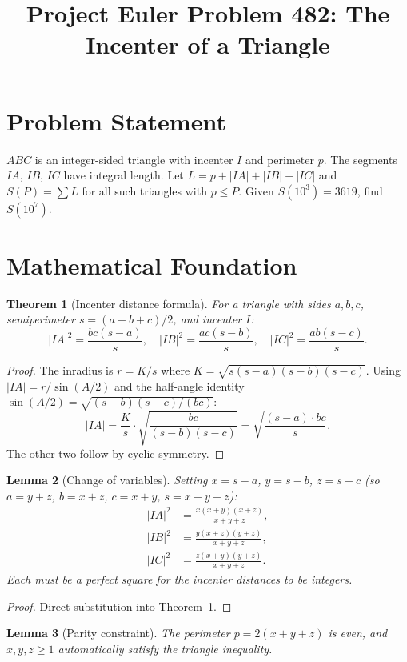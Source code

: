 \documentclass[12pt]{article}
\title{Project Euler Problem 482: The Incenter of a Triangle}
\author{}
\date{}
\newtheorem{theorem}{Theorem}
\newtheorem{lemma}[theorem]{Lemma}
\begin{document}
\maketitle

\section{Problem Statement}
$ABC$ is an integer-sided triangle with incenter $I$ and perimeter $p$. The segments $IA$, $IB$, $IC$ have integral length. Let $L = p + |IA| + |IB| + |IC|$ and $S(P) = \sum L$ for all such triangles with $p \le P$. Given $S(10^3) = 3619$, find $S(10^7)$.

\section{Mathematical Foundation}

\begin{theorem}[Incenter distance formula]
For a triangle with sides $a,b,c$, semiperimeter $s=(a+b+c)/2$, and incenter $I$:
\[
|IA|^2 = \frac{bc(s-a)}{s},\quad |IB|^2 = \frac{ac(s-b)}{s},\quad |IC|^2 = \frac{ab(s-c)}{s}.
\]
\end{theorem}

\begin{proof}
The inradius is $r = K/s$ where $K = \sqrt{s(s-a)(s-b)(s-c)}$. Using $|IA| = r/\sin(A/2)$ and the half-angle identity $\sin(A/2) = \sqrt{(s-b)(s-c)/(bc)}$:
\[
|IA| = \frac{K}{s}\cdot\sqrt{\frac{bc}{(s-b)(s-c)}} = \sqrt{\frac{(s-a)\cdot bc}{s}}.
\]
The other two follow by cyclic symmetry.
\end{proof}

\begin{lemma}[Change of variables]
Setting $x = s-a$, $y = s-b$, $z = s-c$ (so $a=y+z$, $b=x+z$, $c=x+y$, $s=x+y+z$):
\begin{align}
|IA|^2 &= \frac{x(x+y)(x+z)}{x+y+z},\\[4pt]
|IB|^2 &= \frac{y(x+z)(y+z)}{x+y+z},\\[4pt]
|IC|^2 &= \frac{z(x+y)(y+z)}{x+y+z}.
\end{align}
Each must be a perfect square for the incenter distances to be integers.
\end{lemma}

\begin{proof}
Direct substitution into Theorem~1.
\end{proof}

\begin{lemma}[Parity constraint]
The perimeter $p = 2(x+y+z)$ is even, and $x,y,z \ge 1$ automatically satisfy the triangle inequality.
\end{lemma}
\end{document}
